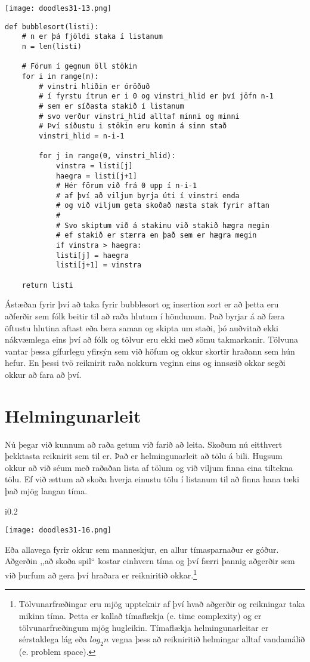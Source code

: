 \begin{center}
	\texttt{[image: doodles31-13.png]}
\end{center}
\newpage

\begin{lstlisting}[caption=Bubble sort reikniritið, label=lst:reiknirit-bubble]
	def bubblesort(listi):
	# n er þá fjöldi staka í listanum
	n = len(listi)
	
	# Förum í gegnum öll stökin
	for i in range(n):
		# vinstri hliðin er óröðuð 
		# í fyrstu ítrun er i 0 og vinstri_hlid er því jöfn n-1
		# sem er síðasta stakið í listanum
		# svo verður vinstri_hlid alltaf minni og minni
		# Því síðustu i stökin eru komin á sinn stað
		vinstri_hlid = n-i-1
		
		for j in range(0, vinstri_hlid):
			vinstra = listi[j]
			haegra = listi[j+1]
			# Hér förum við frá 0 upp í n-i-1
			# af því að viljum byrja úti í vinstri enda 
			# og við viljum geta skoðað næsta stak fyrir aftan
			# 
			# Svo skiptum við á stakinu við stakið hægra megin
			# ef stakið er stærra en það sem er hægra megin
			if vinstra > haegra:
			listi[j] = haegra
			listi[j+1] = vinstra
		
	return listi
\end{lstlisting}

Ástæðan fyrir því að taka fyrir bubblesort og insertion sort er að þetta eru aðferðir sem fólk beitir til að raða hlutum í höndunum.
Það byrjar á að færa öftustu hlutina aftast eða bera saman og skipta um staði, þó auðvitað ekki nákvæmlega eins því að fólk og tölvur eru ekki með sömu takmarkanir. 
Tölvuna vantar þessa gífurlegu yfirsýn sem við höfum og okkur skortir hraðann sem hún hefur.
En þessi tvö reiknirit raða nokkurn veginn eins og innsæið okkar segði okkur að fara að því.


\section{Helmingunarleit}\label{uk:reiknirit-helmingunarleit}
Nú þegar við kunnum að raða getum við farið að leita.
Skoðum nú eitthvert þekktasta reiknirit sem til er. 
Það er helmingunarleit að tölu á bili. 
Hugsum okkur að við séum með raðaðan lista af tölum og við viljum finna eina tiltekna tölu. 
Ef við ættum að skoða hverja einustu tölu í listanum til að finna hana tæki það mjög langan tíma.

\begin{wrapfigure}{i}{0.2\textwidth} %
\begin{center}
	\texttt{[image: doodles31-16.png]}
\end{center}
\end{wrapfigure}
Eða allavega fyrir okkur sem manneskjur, en allur tímasparnaður er góður.
Aðgerðin ,,að skoða spil“ kostar einhvern tíma og því færri þannig aðgerðir sem við þurfum að gera því hraðara er reikniritið okkar.\footnote{Tölvunarfræðingar eru mjög uppteknir af því hvað aðgerðir og reikningar taka mikinn tíma.
Þetta er kallað tímaflækja (e. time complexity) og er tölvunarfræðingum mjög hugleikin.
Tímaflækja helmingunarleitar er sérstaklega lág eða $log_2{n}$ vegna þess að reikniritið helmingar alltaf vandamálið (e. problem space).}

